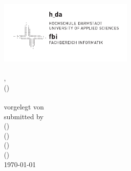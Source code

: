 \begin{titlingpage}
	\vspace*{0cm}
	\sffamily 
	\begin{centering}
		\includegraphics[width=0.5\textwidth]{images/fbi_logo.pdf} \\
		\vspace{2.5cm}
		\Huge
			\textbf{\docType} \\
		\vspace{1cm}
		\normalsize
			\docCourse, \docCourseSemester \\
		\small
			(\textit{\docCourseProf}) \\
		\vspace{3cm}
		\LARGE
			\docTypeRubric \\
		\vspace{4cm}
		\normalsize
			\ifde
				vorgelegt von\\
			\else
				submitted by\\
			\fi
		\vspace{1cm}	
		\large
			\docStudentA \hspace{0.1cm} (\docStudentAMatrikel)\\
			\vspace{0.2cm}
			\docStudentB \hspace{0.1cm} (\docStudentBMatrikel)\\
			\vspace{0.2cm}
			\docStudentC \hspace{0.1cm} (\docStudentCMatrikel)\\
			\vspace{0.2cm}
			\docStudentD \hspace{0.1cm} (\docStudentDMatrikel)\\
			\vspace{1cm}
		\normalsize
			\today \\
	\end{centering}
	
\end{titlingpage}

